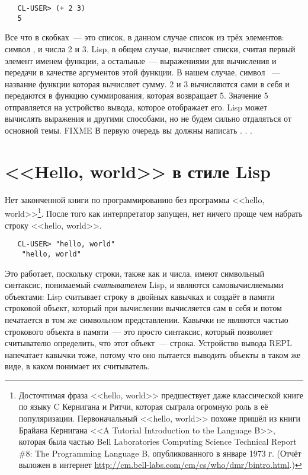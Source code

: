 \begin{verbatim}
   CL-USER> (+ 2 3)
   5
\end{verbatim}

Все что в скобках~--- это список, в данном случае список из трёх элементов: символ \code{+},
и числа 2 и 3. Lisp, в общем случае, вычисляет списки, считая первый элемент именем
функции, а остальные~--- выражениями для вычисления и передачи в качестве аргументов этой
функции. В нашем случае, символ \code{+}~--- название функции которая вычисляет сумму. 2 и 3
вычисляются сами в себя и передаются в функцию суммирования, которая возвращает
5. Значение 5 отправляется на устройство вывода, которое отображает его. Lisp может
вычислять выражения и другими способами, но не будем сильно отдаляться от основной
темы. FIXME В первую очередь вы должны написать . . .

\section{<<Hello, world>> в стиле Lisp}

Нет законченной книги по программированию без программы <<hello,
world>>\footnote{Досточтимая фраза <<hello, world>> предшествует даже классической книге по
  языку C Кернигана и Ритчи, которая сыграла огромную роль в её
  популяризации. Первоначальный <<hello, world>> похоже пришёл из книги Брайана Кернигана <<A
  Tutorial Introduction to the Language B>>, которая была частью Bell Laboratories
  Computing Science Technical Report \#8: The Programming Language B, опубликованного в
  январе 1973 г. (Отчёт выложен в интернет
  \url{http://cm.bell-labs.com/cm/cs/who/dmr/bintro.html}.) }. После того как
интерпретатор запущен, нет ничего проще чем набрать строку <<hello, world>>.

\begin{verbatim}
   CL-USER> "hello, world"
    "hello, world"
\end{verbatim}

Это работает, поскольку строки, также как и числа, имеют символьный синтаксис, понимаемый
\textit{считывателем} Lisp, и являются самовычисляемыми объектами: Lisp считывает строку в
двойных кавычках и создаёт в памяти строковой объект, который при вычислении вычисляется
сам в себя и потом печатается в том же символьном представлении. Кавычки не являются
частью строкового объекта в памяти~--- это просто синтаксис, который позволяет считывателю
определить, что этот объект~--- строка. Устройство вывода REPL напечатает кавычки тоже,
потому что оно пытается выводить объекты в таком же виде, в каком понимает их считыватель.

